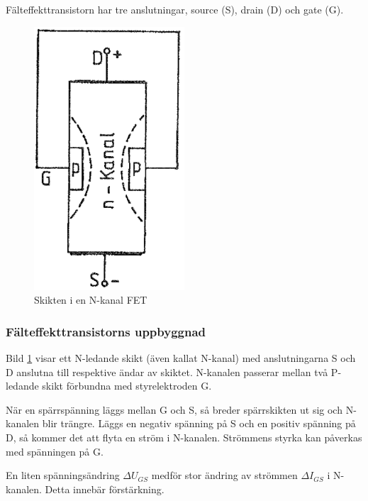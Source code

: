 Fälteffekttransistorn har tre anslutningar, source (S), drain (D) och gate (G).

\begin{figure}
\includegraphics[width=0.5\textwidth]{images/cropped_pdfs/bild_2_2-21.pdf}
\caption{Skikten i en N-kanal FET}
\label{fig:BildII2-21}
\end{figure}

\subsubsection{Fälteffekttransistorns uppbyggnad}

Bild \ref{fig:BildII2-21} visar ett N-ledande skikt (även kallat N-kanal) med
anslutningarna S och D anslutna till respektive ändar av skiktet.
N-kanalen passerar mellan två P-ledande skikt förbundna med styrelektroden G.

När en spärrspänning läggs mellan G och S, så breder spärrskikten ut sig och
N-kanalen blir trängre.
Läggs en negativ spänning på S och en positiv spänning på D, så kommer det att
flyta en ström i N-kanalen.
Strömmens styrka kan påverkas med spänningen på G.

En liten spänningsändring \(\Delta U_{GS}\) medför stor ändring av strömmen
\(\Delta I_{GS}\) i N-kanalen. Detta innebär förstärkning.

